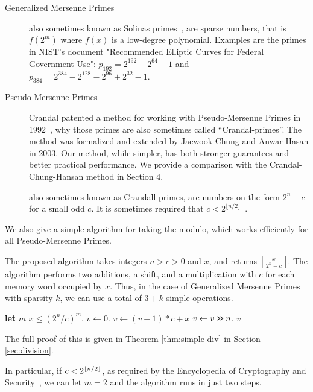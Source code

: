 \begin{description}
   \item[Generalized Mersenne Primes]
      also sometimes known as Solinas primes~\cite{Solinas2011}, are sparse numbers, that is $f(2^m)$ where $f(x)$ is a low-degree polynomial.
      Examples are the primes in NIST's document "Recommended Elliptic Curves for Federal Government Use": $p_{192} = 2^{192} - 2^{64} - 1$ and $p_{384} = 2^{384}-2^{128}-2^{96}+2^{32}-1$.
   \item[Pseudo-Mersenne Primes]
      Crandal patented a method for working with Pseudo-Mersenne Primes in 1992~\cite{crandall1992method},
      why those primes are also sometimes called ``Crandal-primes''.
      The method was formalized and extended by Jaewook Chung and Anwar Hasan in 2003.
      Our method, while simpler, has both stronger guarantees and better practical performance.
   We provide a comparison with the Crandal-Chung-Hansan method in Section 4.

      also sometimes known as Crandall primes, are numbers on the form $2^n - c$ for a small odd $c$.
      It is sometimes required that $c < 2^{\lfloor n/2\rfloor}$~\cite{van2014encyclopedia}.
\end{description}

We also give a simple algorithm for taking the modulo, which works efficiently for all Pseudo-Mersenne Primes.

The proposed algorithm takes integers $n>c>0$ and $x$, and returns
$\left\lfloor\frac{x}{2^n-c}\right\rfloor$.
The algorithm performs two additions, a shift, and a multiplication with $c$ for each memory word occupied by $x$.
Thus, in the case of Generalized Mersenne Primes with sparsity $k$, we can use a total of $3+k$ simple operations.
\begin{algorithm}
   \begin{algorithmic}[1]
         \State \textbf{let} $m$  $x \le (2^n/c)^m$.
         \State $v \gets 0$.
            \State $v \gets (v + 1) * c + x$
            \State $v \gets v \mathbin{\texttt{>\!>}} n$.
         \EndFor
         \State \Return $v$
      \EndProcedure
   \end{algorithmic}
\end{algorithm}
The full proof of this is given in Theorem \ref{thm:simple-div} in Section \ref{sec:division}.


In particular, if $c<2^{\lfloor {n/2} \rfloor}$, as required by the Encyclopedia of Cryptography and Security~\cite{van2014encyclopedia}, we can let $m=2$ and the algorithm runs in just two steps.

